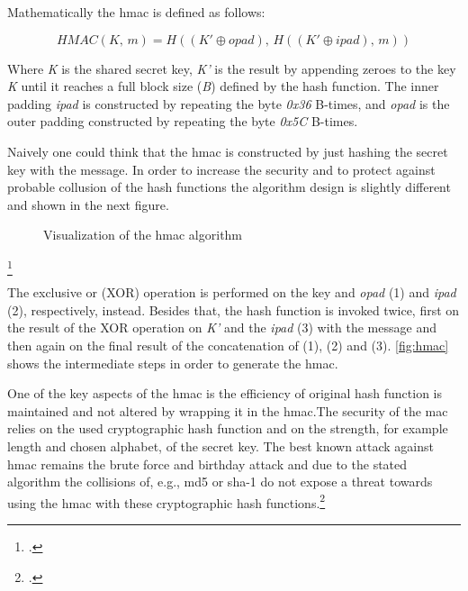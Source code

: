 Mathematically the \gls{hmac} is defined as follows:

\begin{equation*}
	HMAC(K,\, m) = H((K' \oplus opad),\, H((K' \oplus ipad),\, m))
\end{equation*}

Where \textit{K} is the shared secret key, \textit{K'} is the result by appending zeroes to the key \textit{K} until it reaches a full block size (\textit{B}) defined by the hash function. The inner padding \textit{ipad} is constructed by repeating the byte \textit{0x36} B-times, and \textit{opad} is the outer padding constructed by repeating the byte \textit{0x5C} B-times.

Naively one could think that the \gls{hmac} is constructed by just hashing the secret key with the message. In order to increase the security and to protect against probable collusion of the hash functions the algorithm design is slightly different and shown in the next figure.

\newpage

\begin{figure}[hbt]
	\centering
	
	\caption[Visualization of the \gls{hmac} algorithm]{Visualization of the \gls{hmac} algorithm\footnotemark}
	\label{fig:hmac}
\end{figure}
\footcitetext[Source: diagram by author, based on][395]{eckert-it-sec-9}

The exclusive or (XOR) operation is performed on the key and \textit{opad} (1) and \textit{ipad} (2), respectively, instead. Besides that, the hash function is invoked twice, first on the result of the XOR operation on \textit{K'} and the \textit{ipad} (3) with the message and then again on the final result of the concatenation of (1), (2) and (3). \autoref{fig:hmac} shows the intermediate steps in order to generate the \gls{hmac}.

One of the key aspects of the \gls{hmac} is the efficiency of original hash function is maintained and not altered by wrapping it in the \gls{hmac}.The security of the \gls{mac} relies on the used cryptographic hash function and on the strength, for example length and chosen alphabet, of the secret key. The best known attack against \gls{hmac} remains the brute force and birthday attack and due to the stated algorithm the collisions of, e.g., \gls{md}5 or \gls{sha}-1 do not expose a threat towards using the \gls{hmac} with these cryptographic hash functions.\footcites[See][Chapter 10.4.1]{2308830}[See][398]{1679747}[See][3, 10--13]{10.1007/3-540-68697-5_1} 

